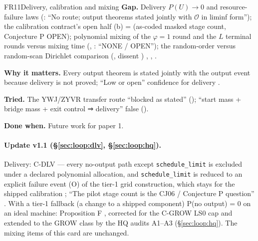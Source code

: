 \begin{card}{FR11}{Delivery, calibration and mixing}
\textbf{Gap.} Delivery $P(U)\to0$ and resource-failure laws (: ``No route; output theorems stated jointly with $\mathcal{O}$ in liminf form''); the calibration contract's open half (b) =  (as-coded masked stage count, Conjecture P OPEN); polynomial mixing of the $\varphi=1$ round and the $L$ terminal rounds versus mixing time (, : ``NONE / OPEN''); the random-order versus random-scan Dirichlet comparison (, dissent ) , , .

\textbf{Why it matters.} Every output theorem is stated jointly with the output event because delivery is not proved; ``Low or open'' confidence for delivery .

\textbf{Tried.} The YWJ/ZYVR transfer route ``blocked as stated'' (); ``start mass + bridge mass + exit control ⇒ delivery'' false ().

\textbf{Done when.} Future work for paper 1.
\paragraph{Update v1.1 (\S\ref{sec:loop:dlv}, \S\ref{sec:loop:hq}).} Delivery: C-DLV  — every no-output path except \texttt{schedule\_limit} is excluded under a declared polynomial allocation, and \texttt{schedule\_limit} is reduced to an explicit failure event (O) of the tier-1 grid construction, which stays  for the shipped calibration ; ``The pilot stage count is the CJ06 / Conjecture P question'' . With a tier-1 fallback (a change to a shipped component) P(no output) = 0 on an ideal machine: Proposition F  , corrected for the C-GROW LS0 cap and extended to the GROW class by the HQ audits A1--A3 (\S\ref{sec:loop:hq}). The mixing items of this card are unchanged.

\end{card}

